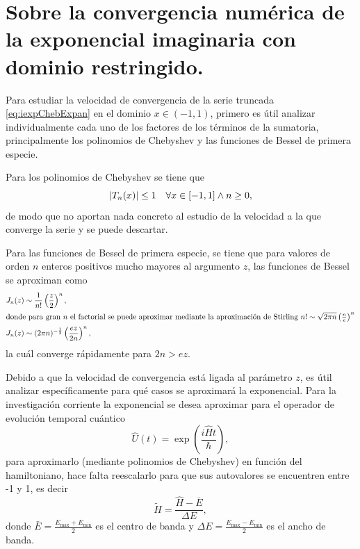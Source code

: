 \section[Sobre la convergencia de la aproximación]{Sobre la convergencia numérica de la exponencial imaginaria con dominio restringido.}

Para estudiar la velocidad de convergencia de la serie truncada \eqref{eq:iexpChebExpan} en el dominio $ x \in (-1, 1) $, primero es útil analizar 
individualmente cada uno de los factores de los términos de la sumatoria, principalmente los polinomios de Chebyshev y las
funciones de Bessel de primera especie.

Para los polinomios de Chebyshev se tiene que 
\begin{equation*}
	\abs{T_n(x)} \leq 1 \quad \forall x \in [-1, 1] \land n \geq 0,
\end{equation*}
de modo que no aportan nada concreto al estudio de la velocidad a la que converge la serie y se puede descartar.

Para las funciones de Bessel de primera especie, se tiene que para valores de orden $n$ enteros positivos mucho mayores
al argumento $z$, las funciones de Bessel se aproximan como
\begin{align*}
	J_n(z) &\sim \frac1{n!}\left( \frac{z}{2} \right)^n,\\
	\intertext{donde para gran $n$ el factorial se puede aproximar mediante la aproximación de Stirling $n! \sim \sqrt{2\pi n}\left( \frac{n}{e}\right)^n$}
	J_n(z) &\sim (2\pi n)^{-\frac12}\left( \frac{ez}{2n} \right)^n,
\end{align*}
la cuál converge rápidamente para $2n > ez$.

Debido a que la velocidad de convergencia está ligada al parámetro $z$, es útil analizar específicamente para qué casos
se aproximará la exponencial. Para la investigación corriente la exponencial se desea aproximar para el operador de
evolución temporal cuántico
\begin{equation}\label{eq:timeEvOp}
	\hat{U}(t) = \exp({\frac{i\hat{H}t}\hbar}),
\end{equation}
para aproximarlo (mediante polinomios de Chebyshev) en función del hamiltoniano, hace falta reescalarlo para que sus 
autovalores se encuentren entre -1 y 1, es decir
\begin{equation}\label{eq:reescaledHam}
	\tilde{H} = \frac{\hat{H} - \bar{E}}{\Delta E},
\end{equation}
donde $\bar E = \frac{E_\mathrm{max} + E_\mathrm{min}}2$ es el centro de banda y 
$\Delta E = \frac{E_\mathrm{max} - E_\mathrm{min}}2$ es el ancho de banda.

